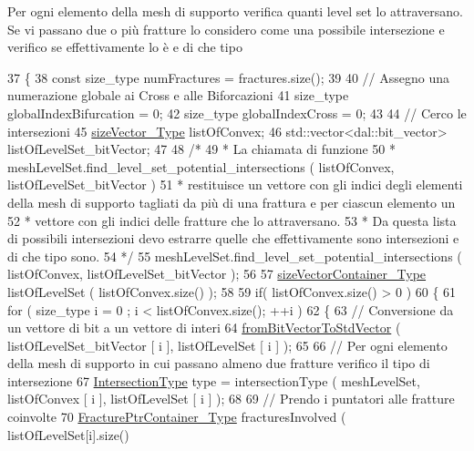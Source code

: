Per ogni elemento della mesh di supporto verifica quanti level set lo attraversano. Se vi passano due o più fratture lo considero come una possibile intersezione e verifico se effettivamente lo è e di che tipo 
\begin{DoxyCode}
37 \{
38     \textcolor{keyword}{const} size\_type numFractures = fractures.size();
39 
40     \textcolor{comment}{// Assegno una numerazione globale ai Cross e alle Biforcazioni}
41     size\_type globalIndexBifurcation = 0;
42     size\_type globalIndexCross = 0;
43 
44     \textcolor{comment}{// Cerco le intersezioni}
45     \hyperlink{Core_8h_a83c51913d041a5001e8683434c09857f}{sizeVector\_Type} listOfConvex;
46     std::vector<dal::bit\_vector> listOfLevelSet\_bitVector;
47 
48     \textcolor{comment}{/*}
49 \textcolor{comment}{     * La chiamata di funzione }
50 \textcolor{comment}{     *              meshLevelSet.find\_level\_set\_potential\_intersections ( listOfConvex,
       listOfLevelSet\_bitVector )}
51 \textcolor{comment}{     * restituisce un vettore con gli indici degli elementi della mesh di supporto tagliati da più di una
       frattura e per ciascun elemento un}
52 \textcolor{comment}{     * vettore con gli indici delle fratture che lo attraversano. }
53 \textcolor{comment}{     * Da questa lista di possibili intersezioni devo estrarre quelle che effettivamente sono intersezioni
       e di che tipo sono.}
54 \textcolor{comment}{     */}
55     meshLevelSet.find\_level\_set\_potential\_intersections ( listOfConvex, listOfLevelSet\_bitVector );
56 
57     \hyperlink{Core_8h_a80e8381d86ecb0a7f4f87ff84d1a0be5}{sizeVectorContainer\_Type} listOfLevelSet ( listOfConvex.size() );
58 
59     \textcolor{keywordflow}{if}( listOfConvex.size() > 0 )
60     \{
61         \textcolor{keywordflow}{for} ( size\_type i = 0 ; i < listOfConvex.size(); ++i )
62         \{
63             \textcolor{comment}{// Conversione da un vettore di bit a un vettore di interi}
64             \hyperlink{UsefulFunctions_8h_a0ea0b08a12a1e6a94718cf3bcd60edeb}{fromBitVectorToStdVector} ( listOfLevelSet\_bitVector [ i ], 
      listOfLevelSet [ i ] );
65 
66             \textcolor{comment}{// Per ogni elemento della mesh di supporto in cui passano almeno due fratture verifico il tipo
       di intersezione}
67             \hyperlink{classFractureIntersect_a9a4e4a784fa4c8e359767ed543f89dc5}{IntersectionType} type = intersectionType ( meshLevelSet, listOfConvex [ i ], 
      listOfLevelSet [ i ] );
68             
69             \textcolor{comment}{// Prendo i puntatori alle fratture coinvolte}
70             \hyperlink{FractureHandler_8h_a2f0b57e18ecf89912d7de0c87158009e}{FracturePtrContainer\_Type} fracturesInvolved ( listOfLevelSet[i].size()

\end{DoxyCode}
